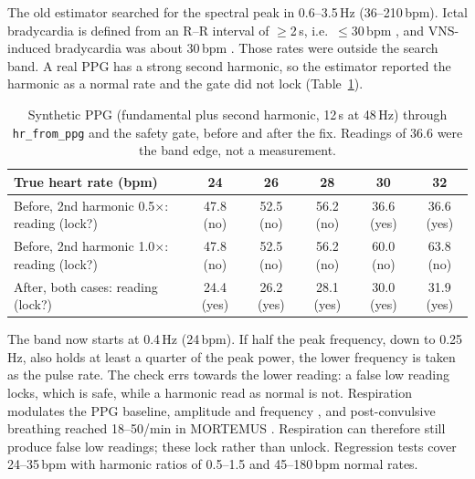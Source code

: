 \documentclass[10pt,a4paper]{article}
\newcommand{\code}[1]{\texttt{\small #1}}
\begin{document}
The old estimator searched for the spectral peak in 0.6--3.5\,Hz (36--210\,bpm). Ictal bradycardia is defined from an
R--R interval of $\ge$2\,s, i.e.\ $\le$30\,bpm \parencite{muccioli2024}, and VNS-induced bradycardia was about 30\,bpm
\parencite{asconape1999}. Those rates were outside the search band. A real PPG has a strong second harmonic, so the
estimator reported the harmonic as a normal rate and the gate did not lock (Table~\ref{tab:ppgbug}).

\begin{table}[ht]
\centering\small
\begin{tabular}{lccccc}
\toprule
True heart rate (bpm) & 24 & 26 & 28 & 30 & 32 \\
\midrule
Before, 2nd harmonic 0.5$\times$: reading (lock?) & 47.8 (no) & 52.5 (no) & 56.2 (no) & 36.6 (yes) & 36.6 (yes) \\
Before, 2nd harmonic 1.0$\times$: reading (lock?) & 47.8 (no) & 52.5 (no) & 56.2 (no) & 60.0 (no) & 63.8 (no) \\
After, both cases: reading (lock?) & 24.4 (yes) & 26.2 (yes) & 28.1 (yes) & 30.0 (yes) & 31.9 (yes) \\
\bottomrule
\end{tabular}
\caption{Synthetic PPG (fundamental plus second harmonic, 12\,s at 48\,Hz) through \code{hr\_from\_ppg} and the safety
gate, before and after the fix. Readings of 36.6 were the band edge, not a measurement.}
\label{tab:ppgbug}
\end{table}

The band now starts at 0.4\,Hz (24\,bpm). If half the peak frequency, down to 0.25\,Hz, also holds at least a quarter of
the peak power, the lower frequency is taken as the pulse rate. The check errs towards the lower reading: a false low
reading locks, which is safe, while a harmonic read as normal is not. Respiration modulates the PPG baseline, amplitude
and frequency \parencite{charlton2018}, and post-convulsive breathing reached 18--50/min in MORTEMUS
\parencite{ryvlin2013}. Respiration can therefore still produce false low readings; these lock rather than unlock.
Regression tests cover 24--35\,bpm with harmonic ratios of 0.5--1.5 and 45--180\,bpm normal rates.
\end{document}
